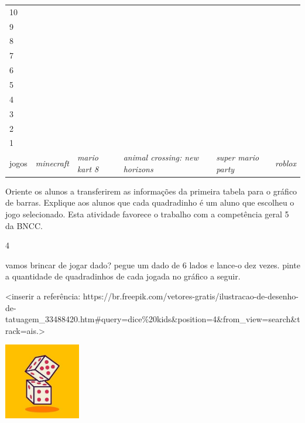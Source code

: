 \begin{longtable}[]{@{}llllll@{}}
\toprule
10 & & & & &\tabularnewline
9 & & & & &\tabularnewline
8 & & & & &\tabularnewline
7 & & & & &\tabularnewline
6 & & & & &\tabularnewline
5 & & & & &\tabularnewline
4 & & & & &\tabularnewline
3 & & & & &\tabularnewline
2 & & & & &\tabularnewline
1 & & & & &\tabularnewline
jogos & \emph{minecraft} & \emph{mario kart 8} & \emph{animal crossing:
new horizons} & \emph{super mario party} & \emph{roblox}\tabularnewline
\bottomrule
\end{longtable}

Oriente os alunos a transferirem as informações da
primeira tabela para o gráfico de barras. Explique aos alunos que cada
quadradinho é um aluno que escolheu o jogo selecionado. Esta atividade
favorece o trabalho com a competência geral 5 da BNCC.

\num{4}

vamos brincar de jogar dado? pegue um dado de 6 lados e lance-o dez
vezes. pinte a quantidade de quadradinhos de cada jogada no gráfico
a seguir.

\textless{}inserir a referência:
https://br.freepik.com/vetores-gratis/ilustracao-de-desenho-de-tatuagem\_33488420.htm\#query=dice\%20kids\&position=4\&from\_view=search\&track=ais.\textgreater{}

\includegraphics[width=1.31250in,height=1.31250in]{media/image97.jpg}

